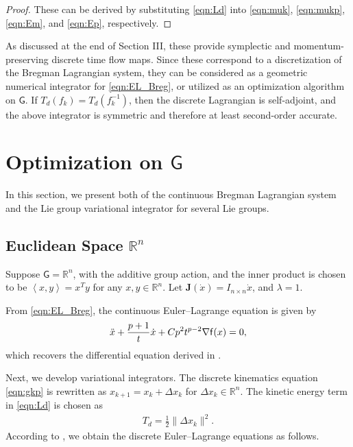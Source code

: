 \documentclass[letterpaper, 10pt, conference]{ieeeconf}
\newcommand{\G}{\ensuremath{\mathsf{G}}}
\renewcommand{\Re}{\ensuremath{\mathbb{R}}}
\newcommand{\pair}[1]{\ensuremath{\left\langle #1 \right\rangle}}
\begin{document}
\begin{proof}
    These can be derived by substituting \eqref{eqn:Ld} into \eqref{eqn:muk}, \eqref{eqn:mukp}, \eqref{eqn:Em}, and \eqref{eqn:Ep}, respectively. 
\end{proof}
As discussed at the end of Section III, these provide symplectic and momentum-preserving discrete time flow maps.
Since these correspond to a discretization of the Bregman Lagrangian system, they can be considered as a geometric numerical integrator for \eqref{eqn:EL_Breg}, or utilized as an optimization algorithm on $\G$.
If $T_d(f_k)=T_d(f_k^{-1})$, then the discrete Lagrangian is self-adjoint, and the above integrator is symmetric and therefore at least second-order accurate.

\section{Optimization on $\G$}

In this section, we present both of the continuous Bregman Lagrangian system and the Lie group variational integrator for several Lie groups.

\subsection{Euclidean Space $\Re^n$}

Suppose $\G=\Re^n$, with the additive group action, and the inner product is chosen to be $\pair{x,y}=x^Ty$ for any $x,y\in\Re^n$.
Let $\mathbf{J}(\dot x) = I_{n\times n} \dot x$, and $\lambda =1$. 

From \eqref{eqn:EL_Breg}, the continuous Euler--Lagrange equation is given by
\begin{align}
    \ddot x + \frac{p+1}{t} \dot x + Cp^2 t^{p-2} \nabla \mathsf{f}(x) = 0,\label{eqn:EL_Re}
\end{align}
which recovers the differential equation derived in \cite{wibisono2016variational}.

Next, we develop variational integrators. 
The discrete kinematics equation \eqref{eqn:gkp} is rewritten as $x_{k+1} = x_k + \Delta x_k$ for $\Delta x_k\in\Re^n$.
The kinetic energy term in \eqref{eqn:Ld} is chosen as
\begin{align}
    T_d =\frac{1}{2}\|\Delta x_k\|^2.\label{eqn:Td_Re}
\end{align}
According to , we obtain the discrete Euler--Lagrange equations as follows.
\end{document}
